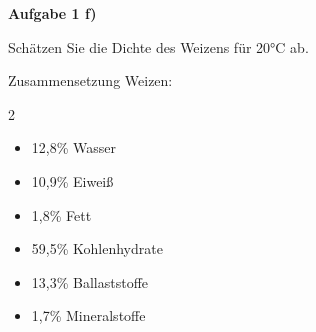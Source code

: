 \documentclass[aspectratio=169,9pt]{beamer}
\newcommand{\pp}{\par \vspace*{2mm}}
\newcommand{\ppbig}{\par \vspace*{4mm}}
\begin{document}
\begin{frame}[t]
\textbf{Aufgabe 1 f)}
\pp
\large
Schätzen Sie die Dichte des Weizens für 20°C ab.
\ppbig
\footnotesize
\begin{minipage}{.47\textwidth}
\vspace*{-8mm}
\setlength{\columnsep}{-4mm}
Zusammensetzung Weizen:
\vspace*{-2mm}
\begin{multicols}{2}
\begin{itemize}
\item 12,8\% Wasser
\item 10,9\% Eiweiß
\item 1,8\% Fett
\item 59,5\% Kohlenhydrate
\item 13,3\% Ballaststoffe
\item 1,7\% Mineralstoffe
\end{itemize}
\end{multicols}


\end{minipage}
\end{frame}
\end{document}
